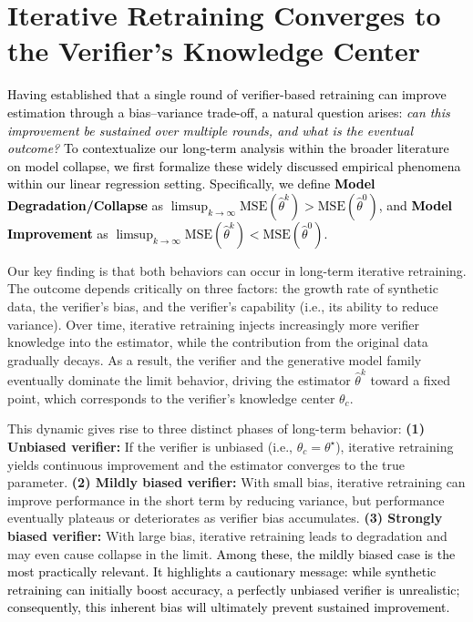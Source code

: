 \section{Iterative Retraining  Converges to the Verifier's Knowledge Center}


\textcolor{black}{
Having established that a single round of verifier-based retraining can improve estimation through a bias--variance trade-off, a natural question arises:
\emph{can this improvement be sustained over multiple rounds, and what is the eventual outcome?}
To contextualize our long-term analysis within the broader literature on model collapse, we first formalize these widely discussed empirical phenomena within our linear regression setting.
Specifically, we define \textbf{Model Degradation/Collapse} as $\limsup_{k \to \infty} \text{MSE}(\hat{\theta}^k)> \text{MSE}(\hat{\theta}^0)$,
and \textbf{Model Improvement} as $\limsup_{k \to \infty} \text{MSE}(\hat{\theta}^k) < \text{MSE}(\hat{\theta}^0)$.
}


Our key finding is that both behaviors can occur in long-term iterative retraining. 
The outcome depends critically on three factors: the growth rate of synthetic data, the verifier's bias, and the verifier's capability (i.e., its ability to reduce variance). 
Over time, iterative retraining injects increasingly more verifier knowledge into the estimator, while the contribution from the original data gradually decays. 
As a result, the verifier and the generative model family eventually dominate the limit behavior, driving the estimator $\hat{\theta}^k$ toward a fixed point, which corresponds to the verifier's knowledge center $\theta_c$. 

This dynamic gives rise to three distinct phases of long-term behavior: \textbf{(1) Unbiased verifier:} If the verifier is unbiased (i.e., $\theta_c= \theta^\star$), iterative retraining yields continuous improvement and the estimator converges to the true parameter.
\textbf{(2) Mildly biased verifier:} With small bias, iterative retraining can improve performance in the short term by reducing variance, but performance eventually plateaus or deteriorates as verifier bias accumulates.
\textbf{(3) Strongly biased verifier:} With large bias, iterative retraining leads to degradation and may even cause collapse in the limit.
\textcolor{black}{Among these, the mildly biased case is the most practically relevant.
It highlights a cautionary message:
while synthetic retraining can initially boost accuracy, a perfectly unbiased verifier is unrealistic; consequently, this inherent bias will ultimately prevent sustained improvement.}

